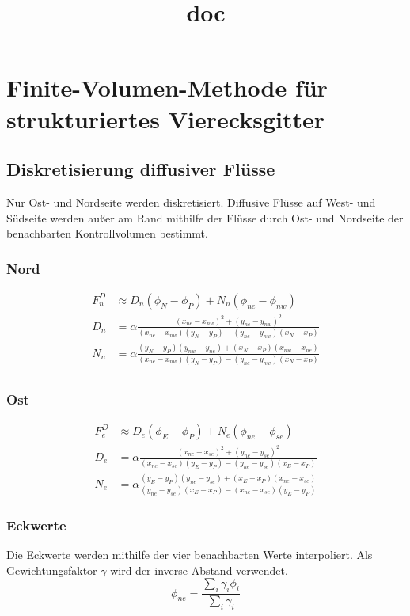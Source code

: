 \documentclass[10pt,a4paper]{article}
\title{doc}
\begin{document}
\section{Finite-Volumen-Methode für strukturiertes Vierecksgitter}
\subsection{Diskretisierung diffusiver Flüsse}
Nur Ost- und Nordseite werden diskretisiert. Diffusive Flüsse auf West- und Südseite werden außer am Rand mithilfe der Flüsse durch Ost- und Nordseite der benachbarten Kontrollvolumen bestimmt.
\subsubsection{Nord}
\begin{align}
F_n^D &\approx D_n ( \phi_N-\phi_P )+N_n(\phi_{ne} - \phi_{nw}) \\
D_n &= \alpha \frac{(x_{ne}-x_{nw})^2 +(y_{ne}-y_{nw})^2}{(x_{ne}-x_{nw})(y_N-y_P)-(y_{ne}-y_{nw})(x_N-x_P)} \\
N_n &= \alpha \frac{(y_N-y_P)(y_{nw}-y_{ne})+(x_N-x_P)(x_{nw}-x_{ne})}{(x_{ne}-x_{nw})(y_N-y_P)-(y_{ne}-y_{nw})(x_N-x_P)} \\
\end{align}
\subsubsection{Ost}
\begin{align}
F_e^D &\approx D_e ( \phi_E-\phi_P )+N_e(\phi_{ne} - \phi_{se}) \\
D_e &= \alpha \frac{(x_{ne}-x_{se})^2 +(y_{ne}-y_{se})^2}{(x_{ne}-x_{se})(y_E-y_P)-(y_{ne}-y_{se})(x_E-x_P)} \\
N_e &= \alpha \frac{(y_E-y_P)(y_{ne}-y_{se})+(x_E-x_P)(x_{ne}-x_{se})}{(y_{ne}-y_{se})(x_E-x_P)-(x_{ne}-x_{se})(y_E-y_P)}
\end{align}
\subsubsection{Eckwerte}
Die Eckwerte werden mithilfe der vier benachbarten Werte interpoliert. Als Gewichtungsfaktor $\gamma$ wird  der inverse Abstand verwendet.
\begin{equation}
\phi_{ne} = \frac{\sum_i \gamma_i \phi_i}{\sum_i \gamma_i}
\end{equation}
\end{document}

